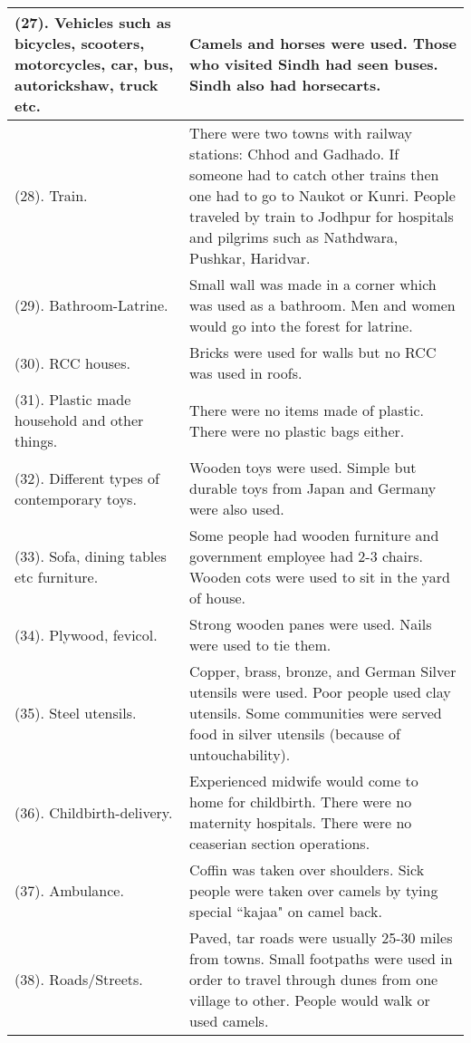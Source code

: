 \begin{center}
\begin{longtable}{p{5cm}|p{10cm}}
\hline
(27). Vehicles such as bicycles, scooters, motorcycles, car, bus, autorickshaw, truck etc. &
Camels and horses were used. Those who visited Sindh had seen buses. Sindh also had horsecarts. \\
\hline
(28). Train. &
There were two towns with railway stations: Chhod and Gadhado. If someone had to catch other trains then one had to go to Naukot or Kunri. People traveled by train to Jodhpur for hospitals and pilgrims such as Nathdwara, Pushkar, Haridvar.\\
\hline
(29). Bathroom-Latrine. &
Small wall was made in a corner which was used as a bathroom. Men and women would go into the forest for latrine.\\
\hline
(30). RCC houses. &
Bricks were used for walls but no RCC was used in roofs.\\
\hline
(31). Plastic made household and other things. &
There were no items made of plastic. There were no plastic bags either. \\
\hline
(32). Different types of contemporary toys. &
Wooden toys were used. Simple but durable toys from Japan and Germany were also used. \\
\hline
(33). Sofa, dining tables etc furniture. &
Some people had wooden furniture and government employee had 2-3 chairs. Wooden cots were used to sit in the yard of house.\\
\hline
(34). Plywood, fevicol. & 
Strong wooden panes were used. Nails were used to tie them. \\
\hline
(35). Steel utensils. &
Copper, brass, bronze, and German Silver utensils were used. Poor people used clay utensils. Some communities were served food in silver utensils (because of untouchability).\\
\hline
(36). Childbirth-delivery. &
Experienced midwife would come to home for childbirth. There were no maternity hospitals. There were no ceaserian section operations.\\
\hline
(37). Ambulance. &
Coffin was taken over shoulders. Sick people were taken over camels by tying special ``kajaa" on camel back.\\
\hline
(38). Roads/Streets. &
Paved, tar roads were usually 25-30 miles from towns. Small footpaths were used in order to travel through dunes from one village to other. People would walk or used camels.\\
\hline
\end{longtable}
\end{center}

